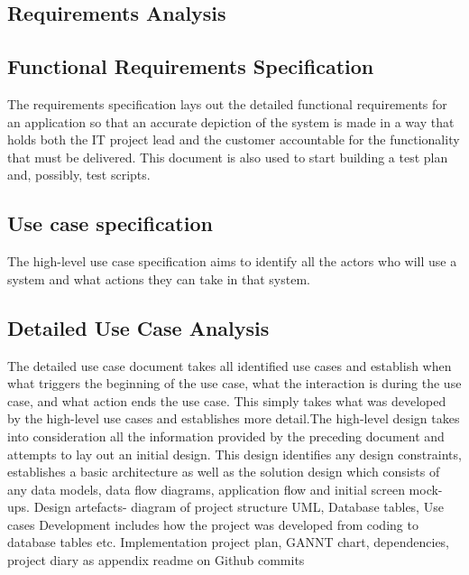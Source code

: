 \documentclass[a4paper,12pt]{article}
\begin{document}
\begin{samepage}
\section {Requirements Analysis}

\subsection {Functional Requirements Specification}

The requirements specification lays out the detailed functional requirements for an application so that an
accurate depiction of the system is made in a way that holds both the IT project lead and the customer accountable for the functionality that must be delivered.  This document is also used to start building a test plan and, possibly, test scripts.

\subsection {Use case specification}
The high-level use case specification aims to identify all the actors who will use a system and what
actions they can take in that system.

\subsection {Detailed Use Case Analysis}
The detailed use case document takes all identified use cases and establish when what triggers the
beginning of the use case, what the interaction is during the use case, and what action ends the use case.  This simply takes what
was developed by the high-level use cases and establishes more detail.The high-level design takes into consideration all the information provided by the preceding document and attempts to lay out an initial design.  This design identifies any design constraints, establishes a basic architecture as well as the solution design which consists of any data models, data flow diagrams, application flow and initial screen mock-ups. Design artefacts- diagram of project structure UML, Database tables, Use cases Development includes how the project was developed from coding to database tables etc. Implementation project plan, GANNT chart, dependencies, project diary as appendix readme on Github commits
\end{samepage}
\end{document}
